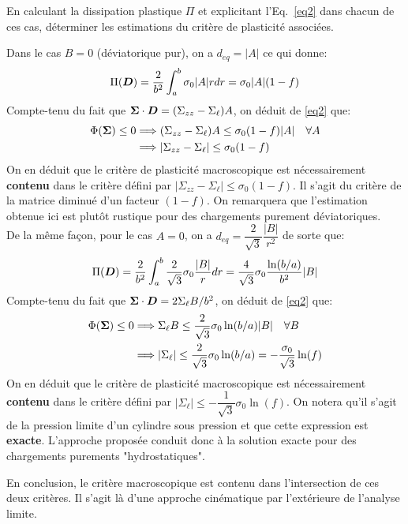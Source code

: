 \documentclass[french,12pt]{exam}
\begin{document}
\begin{questions}
\question En calculant la dissipation plastique $\Pi$ et explicitant l'Eq.~\ref{eq2} dans chacun de ces cas, déterminer les estimations du critère de plasticité associées.
\begin{solution}
Dans le cas $B=0$ (déviatorique pur), on a $d_{eq}=|A|$ ce qui donne:
$$ \Pi(\boldsymbol{D}) = \frac{2}{b^2} \int_a^b \sigma_0 |A| rdr = \sigma_0 |A|(1-f)$$
Compte-tenu du fait que $\boldsymbol{\Sigma} \cdot \boldsymbol{D} = (\Sigma_{zz}-\Sigma_\ell)A$, on déduit de \eqref{eq2} que:
\begin{align*}
\Phi(\boldsymbol{\Sigma}) \leq 0 &\Longrightarrow (\Sigma_{zz}-\Sigma_\ell)A \leq \sigma_0 (1-f)|A| \quad \forall A\\
&\Longrightarrow |\Sigma_{zz}-\Sigma_\ell| \leq \sigma_0(1-f)
\end{align*}
On en déduit que le critère de plasticité macroscopique est nécessairement \textbf{contenu} dans le critère défini par $|\Sigma_{zz}-\Sigma_\ell| \leq \sigma_0(1-f)$. Il s'agit du critère de la matrice diminué d'un facteur $(1-f)$. On remarquera que l'estimation obtenue ici est plutôt rustique pour des chargements purement déviatoriques.\\

De la même façon, pour le cas $A=0$, on a $d_{eq} = \dfrac{2}{\sqrt{3}}\dfrac{|B|}{r^2}$ de sorte que:
$$ \Pi(\boldsymbol{D}) = \frac{2}{b^2} \int_a^b  \dfrac{2}{\sqrt{3}}\sigma_0 \dfrac{|B|}{r} dr = \dfrac{4}{\sqrt{3}}\sigma_0 \dfrac{\ln(b/a)}{b^2}|B|$$
Compte-tenu du fait que $\boldsymbol{\Sigma} \cdot \boldsymbol{D} = 2\Sigma_\ell B/b^2$, on déduit de \eqref{eq2} que:
\begin{align*}
\Phi(\boldsymbol{\Sigma}) \leq 0 &\Longrightarrow \Sigma_\ell B \leq \dfrac{2}{\sqrt{3}}\sigma_0 \ln(b/a)|B| \quad \forall B\\
&\Longrightarrow |\Sigma_\ell| \leq \dfrac{2}{\sqrt{3}}\sigma_0 \ln(b/a) = -\dfrac{\sigma_0}{\sqrt 3}\ln(f)
\end{align*}
On en déduit que le critère de plasticité macroscopique est nécessairement \textbf{contenu} dans le critère défini par $|\Sigma_\ell| \leq -\dfrac{1}{\sqrt{3}}\sigma_0 \ln(f)$. On notera qu'il s'agit de la pression limite d'un cylindre sous pression et que cette expression est \textbf{exacte}. L'approche proposée conduit donc à la solution exacte pour des chargements purements "hydrostatiques".

En conclusion, le critère macroscopique est contenu dans l'intersection de ces deux critères. Il s'agit là d'une approche cinématique par l'extérieure de l'analyse limite.
\end{solution}


\end{questions}
\end{document}
